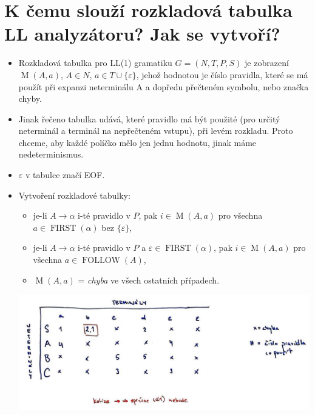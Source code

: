\documentclass{article}
\begin{document}
\section{K čemu slouží rozkladová tabulka LL analyzátoru? Jak se vytvoří?}
\begin{itemize}
  \item Rozkladová tabulka pro LL(1) gramatiku $ G = (N, T, P, S) $ je zobrazení $\operatorname{M}(A, a)$, $A \in N$, $a \in T \cup \{\varepsilon\}$, jehož hodnotou je číslo pravidla, které se má použít při expanzi neterminálu A a dopředu přečteném symbolu, nebo značka chyby.
  \item Jinak řečeno tabulka udává, které pravidlo má být použité (pro určitý neterminál a terminál na nepřečteném vstupu), při levém rozkladu. Proto chceme, aby každé políčko mělo jen jednu hodnotu, jinak máme nedeterminismus.
  \item $\varepsilon$ v tabulce značí EOF.
  \item Vytvoření rozkladové tabulky:
  \begin{itemize}
    \item je-li $A \rightarrow \alpha $ i-té pravidlo v $P$, pak $i \in \operatorname{M}(A,a)$ pro všechna $a \in \operatorname{FIRST}(\alpha)$ bez $\{\varepsilon\}$,
    \item je-li $A \rightarrow \alpha $ i-té pravidlo v $P$ a $ \varepsilon \in \operatorname{FIRST}(\alpha)$, pak $i \in \operatorname{M}(A,a) $ pro všechna $ a \in \operatorname{FOLLOW}(A)$,
    \item $\operatorname{M}(A,a)$ = \emph{chyba} ve všech ostatních případech.
  \end{itemize}
\includegraphics[width=\textwidth]{rozkladova_tabulka.jpg}
\end{itemize}
\newpage
\end{document}
